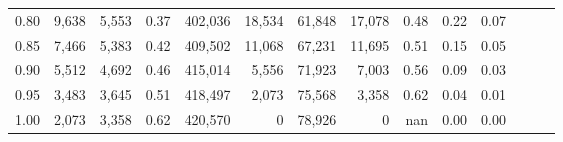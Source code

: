 \begin{tabular}{rrrrrrrrrrrrrr}
0.80 &   9,638 &  5,553 &  0.37 &  402,036 &   18,534 &  61,848 &  17,078 &  0.48 &  0.22 &      0.07 \\
0.85 &   7,466 &  5,383 &  0.42 &  409,502 &   11,068 &  67,231 &  11,695 &  0.51 &  0.15 &      0.05 \\
0.90 &   5,512 &  4,692 &  0.46 &  415,014 &    5,556 &  71,923 &   7,003 &  0.56 &  0.09 &      0.03 \\
0.95 &   3,483 &  3,645 &  0.51 &  418,497 &    2,073 &  75,568 &   3,358 &  0.62 &  0.04 &      0.01 \\
1.00 &   2,073 &  3,358 &  0.62 &  420,570 &        0 &  78,926 &       0 &   nan &  0.00 &      0.00 \\
\bottomrule
\end{tabular}
